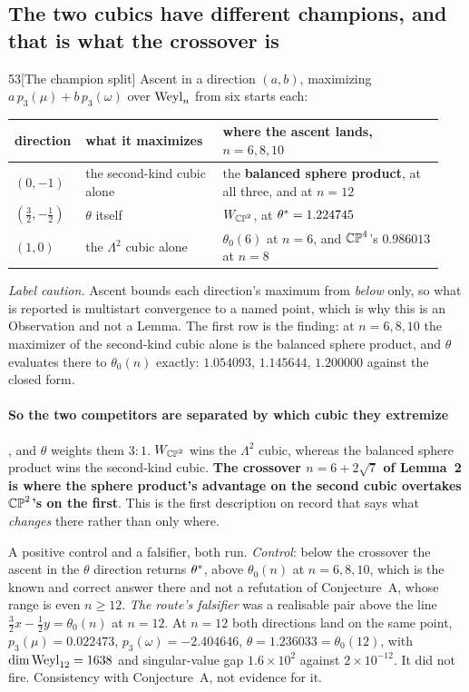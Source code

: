 \subsection{The two cubics have different champions, and that is what the crossover is}\label{sec:champions}

\begin{Obs}{53}[The champion split]
Ascent in a direction $(a,b)$, maximizing $a\,p_3(\mu)+b\,p_3(\omega)$ over $\mathrm{Weyl}_n$ from six starts each:
\begin{center}
\begin{tabular}{@{}p{0.13\linewidth}p{0.31\linewidth}p{0.50\linewidth}@{}}
\toprule
direction & what it maximizes & where the ascent lands, $n=6,8,10$ \\
\midrule
$(0,-1)$ & the second-kind cubic alone & the \textbf{balanced sphere product}, at all three, and at $n=12$ \\
$(\tfrac32,-\tfrac12)$ & $\theta$ itself & $W_{\mathbb{CP}^2}$, at $\theta^{*}=1.224745$ \\
$(1,0)$ & the $\Lambda^2$ cubic alone & $\theta_0(6)$ at $n=6$, and $\mathbb{CP}^4$'s $0.986013$ at $n=8$ \\
\bottomrule
\end{tabular}
\end{center}
\end{Obs}

\emph{Label caution.} Ascent bounds each direction's maximum from \emph{below} only, so what is reported is multistart convergence to a named point, which is why this is an Observation and not a Lemma. The first row is the finding: at $n=6,8,10$ the maximizer of the second-kind cubic alone is the balanced sphere product, and $\theta$ evaluates there to $\theta_0(n)$ exactly: $1.054093$, $1.145644$, $1.200000$ against the closed form.

\paragraph{So the two competitors are separated by which cubic they extremize}, and $\theta$ weights them $3:1$. $W_{\mathbb{CP}^2}$ wins the $\Lambda^2$ cubic, whereas the balanced sphere product wins the second-kind cubic. \textbf{The crossover $n=6+2\sqrt7$ of Lemma~2 is where the sphere product's advantage on the second cubic overtakes $\mathbb{CP}^2$'s on the first}. This is the first description on record that says what \emph{changes} there rather than only where.

\begin{certificate}
A positive control and a falsifier, both run. \emph{Control}: below the crossover the ascent in the $\theta$ direction returns $\theta^{*}$, above $\theta_0(n)$ at $n=6,8,10$, which is the known and correct answer there and not a refutation of Conjecture~A, whose range is even $n\ge12$. \emph{The route's falsifier} was a realisable pair above the line $\tfrac32x-\tfrac12y=\theta_0(n)$ at $n=12$. At $n=12$ both directions land on the same point, $p_3(\mu)=0.022473$, $p_3(\omega)=-2.404646$, $\theta=1.236033=\theta_0(12)$, with $\dim\mathrm{Weyl}_{12}=1638$ and singular-value gap $1.6\times10^2$ against $2\times10^{-12}$. It did not fire. Consistency with Conjecture~A, not evidence for it.
\end{certificate}

